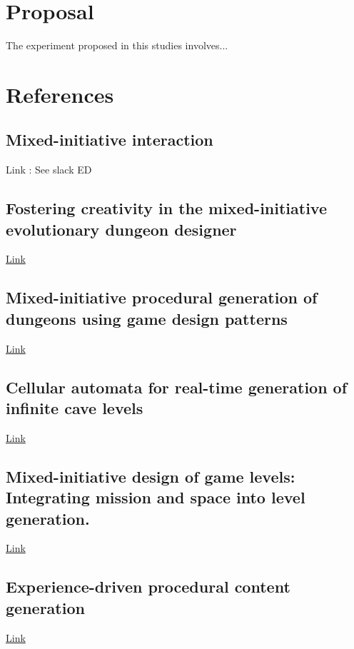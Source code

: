 \documentclass[journal]{IEEEtran}
\begin{document}
\section{Proposal}
The experiment proposed in this studies involves...

\section{References}
\subsection{Mixed-initiative interaction\cite{allen1999mixed}}
Link : See slack ED

\subsection{Fostering creativity in the mixed-initiative evolutionary dungeon designer\cite{alvarez2018fostering}}
\href{https://muep.mau.se/bitstream/handle/2043/25889/Nolasco_O%CC%88sterman.pdf?sequence=1&isAllowed=y}{Link}

\subsection{Mixed-initiative procedural generation of dungeons using game design patterns\cite{baldwin2017mixed}}
\href{https://muep.mau.se/bitstream/handle/2043/22832/baldwin-holmberg_mixed-initiative-procedural_FINAL.pdf?sequence=2&isAllowed=y}{Link}

\subsection{Cellular automata for real-time generation of infinite cave levels\cite{johnson2010cellular}}
\href{https://dl-acm-org.ezproxy.falmouth.ac.uk/citation.cfm?id=1814266}{Link}
\subsection{Mixed-initiative  design  of game levels: Integrating mission and space into level generation.\cite{karavolos2015mixed}}
\href{http://www.fdg2015.org/papers/fdg2015_paper_25.pdf}{Link}

\subsection{Experience-driven procedural content generation\cite{yannakakis2011experience}}
\href{https://ieeexplore-ieee-org.ezproxy.falmouth.ac.uk/document/5740836}{Link}
\end{document}
